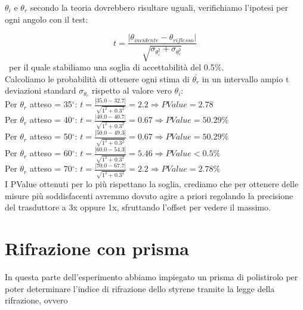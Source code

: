 \documentclass{article}
\theoremstyle{definition}
\begin{document}
\noindent $\theta_i$ e $\theta_r$ secondo la teoria dovrebbero risultare uguali, verifichiamo l'ipotesi per ogni angolo con il test:

\[t=\frac{|\theta_{incidente}-\theta_{riflesso} |}{\sqrt{\sigma_\theta_i^2+\sigma_\theta_r^2}}\]\
per il quale stabiliamo una soglia di accettabilità del 0.5\%.\\

\noindent Calcoliamo le probabilità di ottenere ogni stima di $\bar{\theta_{r}}$ in un intervallo ampio t deviazioni standard $\sigma_{\theta_{r}}$ rispetto al valore vero $\theta_{i}$:\\



Per $\theta_{r}$ atteso = 35\(^{\circ}\): \(t=\frac{\left|35.0-32.7\right|}{\sqrt{1^2+0.3^2}}=2.2 \Rightarrow PValue=2.78\)\\

Per $\theta_{r}$ atteso = 40\(^{\circ}\): \(t=\frac{|40.0-40.7|}{\sqrt{1^2+0.3^{2}}}=0.67 \Rightarrow PValue=50.29\%\)\\

Per $\theta_{r}$ atteso = 50\(^{\circ}\): \(t=\frac{\left |50.0-49.3\right |}{\sqrt{1^2+0.3{^2}}}=0.67 \Rightarrow PValue=50.29\%\)\\

Per $\theta_{r}$ atteso = 60\(^{\circ}\): \(t=\frac{\left|60.0-54.3\right|}{\sqrt{1^2+0.3^{2}}}=5.46 \Rightarrow PValue<0.5\%\)\\

Per $\theta_{r}$ atteso = 70\(^{\circ}\): \(t=\frac{\left|70.0-67.7\right|}{\sqrt{1^2+0.3^{2}}}=2.2 \Rightarrow PValue=2.78\%\)\\

I PValue ottenuti per lo più rispettano la soglia, crediamo che per ottenere delle misure più soddisfacenti avremmo dovuto agire a priori regolando la precisione del trasduttore a 3x oppure 1x, sfruttando l'offset per vedere il massimo. 




\pagebreak

\section{Rifrazione con prisma}

In questa parte dell'esperimento abbiamo impiegato un prisma di polistirolo per poter determinare l'indice di rifrazione dello styrene tramite la legge della rifrazione, ovvero
\end{document}
